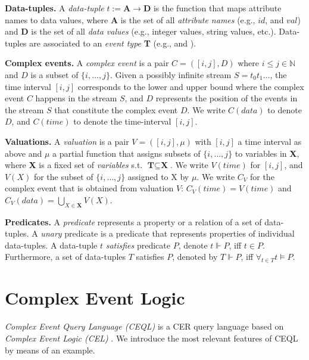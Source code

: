 \textbf{Data-tuples.} A \emph{data-tuple} $t := \textbf{A} \to \textbf{D}$ is the function that maps attribute names to data values, where \textbf{A} is the set of all \emph{attribute names} (e.g., $id$, and $val$) and \textbf{D} is the set of all \emph{data values} (e.g., integer values, string values, etc.). Data-tuples are associated to an \emph{event type} \textbf{T} (e.g.,  and ).

\textbf{Complex events.} A \emph{complex event} is a pair $C = ([i,j], D)$ where $i \le j \in \mathbb{N}$ and $D$ is a subset of $\{i, \ldots, j\}$. Given a possibly infinite stream $S = t_{0}t_{1}\ldots$, the time interval $[i, j]$ corresponds to the lower and upper bound where the complex event $C$ happens in the stream $S$, and $D$ represents the position of the events in the stream $S$ that constitute the complex event $D$. We write $C(data)$ to denote $D$, and $C(time)$ to denote the time-interval $[i, j]$.

\textbf{Valuations.} A \emph{valuation} is a pair $V = ([i, j], \mu)$ with $[i,j]$ a time interval as above and $\mu$ a partial function that assigns subsets of $\{i, \ldots, j\}$ to variables in \textbf{X}, where \textbf{X} is a fixed set of \emph{variables} s.t. $\textbf{T} \subseteq \textbf{X}$. We write $V(time)$ for $[i,j]$, and $V(X)$ for the subset of $\{i,\ldots, j\}$ assigned to X by $\mu$. We write $C_{V}$ for the complex event that is obtained from valuation $V$: $C_{V}(time) = V(time)$ and $C_{V}(data) = \bigcup\limits_{X \in \textbf{X}} V(X)$.

\textbf{Predicates.} A \emph{predicate} represents a property or a relation of a set of data-tuples. A \emph{unary} predicate is a predicate that represents properties of individual data-tuples. A data-tuple $t$ \emph{satisfies} predicate $P$, denote $t \Vdash P$, iff $t \in P$. Furthermore, a set of data-tuples $T$ satisfies $P$, denoted by $T \Vdash P$, iff $\displaystyle\mathop{\forall}_{t \in T} t \vDash P$.

\section{Complex Event Logic}\label{sec:ceql}

\emph{Complex Event Query Language (CEQL)} \cite{core} is a CER query language based on \emph{Complex Event Logic (CEL)} \cite{formal-framework-cep}. We introduce the most relevant features of CEQL by means of an example.

